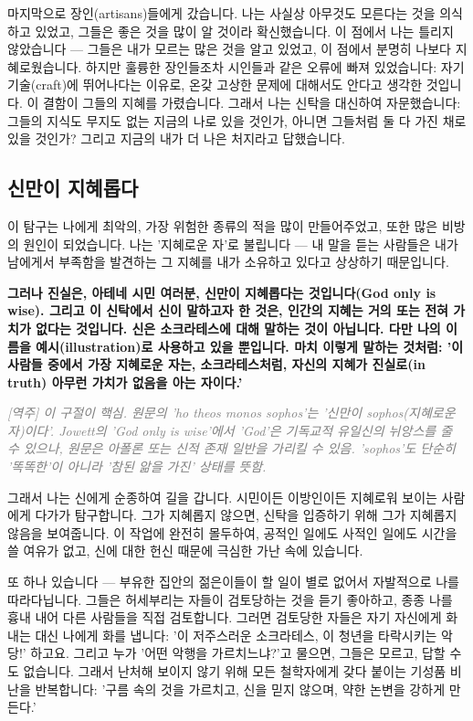 \documentclass[11pt, a4paper]{article}
\newcommand{\tnote}[1]{\par\noindent\textit{\textcolor{gray}{[역주] #1}}\par\smallskip}
\begin{document}
마지막으로 장인(artisans)들에게 갔습니다. 나는 사실상 아무것도 모른다는 것을 의식하고 있었고, 그들은 좋은 것을 많이 알 것이라 확신했습니다. 이 점에서 나는 틀리지 않았습니다 — 그들은 내가 모르는 많은 것을 알고 있었고, 이 점에서 분명히 나보다 지혜로웠습니다. 하지만 훌륭한 장인들조차 시인들과 같은 오류에 빠져 있었습니다: 자기 기술(craft)에 뛰어나다는 이유로, 온갖 고상한 문제에 대해서도 안다고 생각한 것입니다. 이 결함이 그들의 지혜를 가렸습니다. 그래서 나는 신탁을 대신하여 자문했습니다: 그들의 지식도 무지도 없는 지금의 나로 있을 것인가, 아니면 그들처럼 둘 다 가진 채로 있을 것인가? 그리고 지금의 내가 더 나은 처지라고 답했습니다.


\bigskip


\subsection{신만이 지혜롭다}


이 탐구는 나에게 최악의, 가장 위험한 종류의 적을 많이 만들어주었고, 또한 많은 비방의 원인이 되었습니다. 나는 '지혜로운 자'로 불립니다 — 내 말을 듣는 사람들은 내가 남에게서 부족함을 발견하는 그 지혜를 내가 소유하고 있다고 상상하기 때문입니다.


\textbf{그러나 진실은, 아테네 시민 여러분, 신만이 지혜롭다는 것입니다(God only is wise). 그리고 이 신탁에서 신이 말하고자 한 것은, 인간의 지혜는 거의 또는 전혀 가치가 없다는 것입니다. 신은 소크라테스에 대해 말하는 것이 아닙니다. 다만 나의 이름을 예시(illustration)로 사용하고 있을 뿐입니다. 마치 이렇게 말하는 것처럼: '이 사람들 중에서 가장 지혜로운 자는, 소크라테스처럼, 자신의 지혜가 진실로(in truth) 아무런 가치가 없음을 아는 자이다.'}


\tnote{이 구절이 핵심. 원문의 'ho theos monos sophos'는 '신만이 sophos(지혜로운 자)이다'. Jowett의 'God only is wise'에서 'God'은 기독교적 유일신의 뉘앙스를 줄 수 있으나, 원문은 아폴론 또는 신적 존재 일반을 가리킬 수 있음. 'sophos'도 단순히 '똑똑한'이 아니라 '참된 앎을 가진' 상태를 뜻함.}


그래서 나는 신에게 순종하여 길을 갑니다. 시민이든 이방인이든 지혜로워 보이는 사람에게 다가가 탐구합니다. 그가 지혜롭지 않으면, 신탁을 입증하기 위해 그가 지혜롭지 않음을 보여줍니다. 이 작업에 완전히 몰두하여, 공적인 일에도 사적인 일에도 시간을 쓸 여유가 없고, 신에 대한 헌신 때문에 극심한 가난 속에 있습니다.


또 하나 있습니다 — 부유한 집안의 젊은이들이 할 일이 별로 없어서 자발적으로 나를 따라다닙니다. 그들은 허세부리는 자들이 검토당하는 것을 듣기 좋아하고, 종종 나를 흉내 내어 다른 사람들을 직접 검토합니다. 그러면 검토당한 자들은 자기 자신에게 화내는 대신 나에게 화를 냅니다: '이 저주스러운 소크라테스, 이 청년을 타락시키는 악당!' 하고요. 그리고 누가 '어떤 악행을 가르치느냐?'고 물으면, 그들은 모르고, 답할 수도 없습니다. 그래서 난처해 보이지 않기 위해 모든 철학자에게 갖다 붙이는 기성품 비난을 반복합니다: '구름 속의 것을 가르치고, 신을 믿지 않으며, 약한 논변을 강하게 만든다.'
\end{document}
